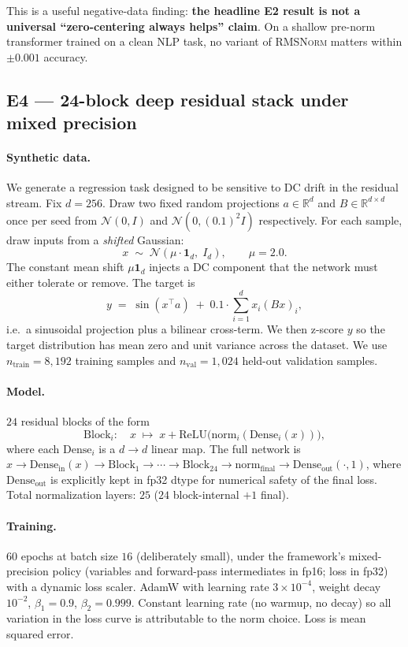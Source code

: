 \documentclass{article}
\newcommand{\R}{\mathbb{R}}
\newcommand{\rms}{\textsc{RMSNorm}}
\begin{document}
This is a useful negative-data finding: \textbf{the headline E2 result is not a universal ``zero-centering always helps'' claim}. On a shallow pre-norm transformer trained on a clean NLP task, no variant of \rms{} matters within $\pm 0.001$ accuracy.

\subsection{E4 --- 24-block deep residual stack under mixed precision}
\label{sec:e4}

\paragraph{Synthetic data.}
We generate a regression task designed to be sensitive to DC drift in the residual stream.
Fix $d{=}256$.
Draw two fixed random projections $a \in \R^d$ and $B \in \R^{d \times d}$ once per seed from $\mathcal{N}(0, I)$ and $\mathcal{N}(0, (0.1)^2 I)$ respectively.
For each sample, draw inputs from a \emph{shifted} Gaussian:
$$x \;\sim\; \mathcal{N}(\mu \cdot \mathbf{1}_d,\; I_d), \qquad \mu = 2.0.$$
The constant mean shift $\mu \mathbf{1}_d$ injects a DC component that the network must either tolerate or remove.
The target is
$$y \;=\; \sin(x^\top a) \;+\; 0.1 \cdot \sum_{i=1}^{d} x_i (Bx)_i,$$
i.e.\ a sinusoidal projection plus a bilinear cross-term.
We then z-score $y$ so the target distribution has mean zero and unit variance across the dataset.
We use $n_{\text{train}} = 8{,}192$ training samples and $n_{\text{val}} = 1{,}024$ held-out validation samples.

\paragraph{Model.}
$24$ residual blocks of the form
$$\text{Block}_i: \quad x \;\mapsto\; x + \text{ReLU}\bigl(\text{norm}_i(\text{Dense}_i(x))\bigr),$$
where each $\text{Dense}_i$ is a $d \to d$ linear map.
The full network is $x \to \text{Dense}_{\text{in}}(x) \to \text{Block}_1 \to \cdots \to \text{Block}_{24} \to \text{norm}_{\text{final}} \to \text{Dense}_{\text{out}}(\cdot, 1)$, where $\text{Dense}_{\text{out}}$ is explicitly kept in fp32 dtype for numerical safety of the final loss.
Total normalization layers: $25$ ($24$ block-internal $+ 1$ final).

\paragraph{Training.}
$60$ epochs at batch size $16$ (deliberately small), under the framework's mixed-precision policy (variables and forward-pass intermediates in fp16; loss in fp32) with a dynamic loss scaler.
AdamW with learning rate $3 \times 10^{-4}$, weight decay $10^{-2}$, $\beta_1 = 0.9$, $\beta_2 = 0.999$.
Constant learning rate (no warmup, no decay) so all variation in the loss curve is attributable to the norm choice.
Loss is mean squared error.
\end{document}
